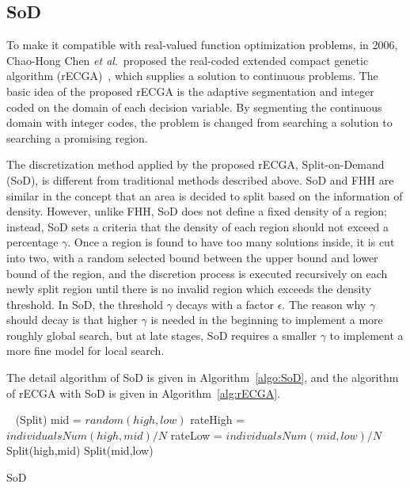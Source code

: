 \subsection{SoD} \label{sec:SoD} To make it compatible with real-valued
function optimization problems, in 2006, Chao-Hong Chen \textit{et al}.\ proposed
the real-coded extended compact genetic algorithm
(rECGA)~\cite{chen2006adaptive}, which supplies a solution to continuous
problems.  The basic idea of the
proposed rECGA is the adaptive segmentation and integer coded on the
domain of each decision variable.  By segmenting the continuous domain
with integer codes, the problem is changed from searching a solution to
searching a promising region.

The discretization method applied by the proposed rECGA, Split-on-Demand
(SoD), is different from traditional methods described above.  SoD and
FHH are similar in the concept that an area is decided to split based on
the information of density.  However, unlike FHH, SoD does not define a
fixed density of a region; instead, SoD sets a criteria that the density
of each region should not exceed a percentage $\gamma$.  Once a region
is found to have too many solutions inside, it is cut into two, with a
random selected bound between the upper bound and lower bound of the
region, and the discretion process is executed recursively on each newly
split region until there is no invalid region which exceeds the density
threshold.  In SoD, the threshold $\gamma$ decays with a factor
$\epsilon$.  The reason why $\gamma$ should decay is that higher
$\gamma$ is needed in the beginning to implement a more roughly global
search, but at late stages, SoD requires a smaller $\gamma$ to implement
a more fine model for local search. 

The detail algorithm of SoD is given in Algorithm~\ref{algo:SoD}, and
the algorithm of rECGA with SoD is given in Algorithm~\ref{alg:rECGA}.
\begin{algorithm}  {
    \  \Begin(Split) { mid = $random(high,low)$\; rateHigh
    =	$individualsNum(high,mid) / N$\; rateLow =
    $individualsNum(mid,low) /N$\;  {
    Split(high,mid)\;   }   { Split(mid,low)\;     }  } } \caption{SoD} \label{algo:SoD}\end{algorithm}

